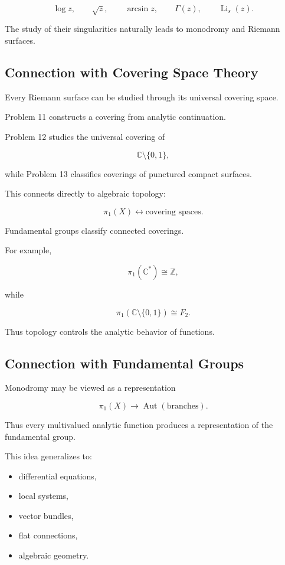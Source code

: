 \documentclass[12pt,a4paper]{article}
\theoremstyle{notespace}
\begin{document}
\[
\log z,
\qquad
\sqrt z,
\qquad
\arcsin z,
\qquad
\Gamma(z),
\qquad
\operatorname{Li}_s(z).
\]

The study of their singularities naturally leads to monodromy and Riemann surfaces.

\subsection{Connection with Covering Space Theory}

Every Riemann surface can be studied through its universal covering space.

Problem 11 constructs a covering from analytic continuation.

Problem 12 studies the universal covering of

\[
\mathbb C\setminus\{0,1\},
\]

while Problem 13 classifies coverings of punctured compact surfaces.

This connects directly to algebraic topology:

\[
\pi_1(X)
\longleftrightarrow
\text{covering spaces}.
\]

Fundamental groups classify connected coverings.

For example,

\[
\pi_1(\mathbb C^*)
\cong
\mathbb Z,
\]

while

\[
\pi_1(\mathbb C\setminus\{0,1\})
\cong
F_2.
\]

Thus topology controls the analytic behavior of functions.

\subsection{Connection with Fundamental Groups}

Monodromy may be viewed as a representation

\[
\pi_1(X)
\longrightarrow
\operatorname{Aut}(\text{branches}).
\]

Thus every multivalued analytic function produces a representation of the fundamental group.

This idea generalizes to:

\begin{itemize}
	\item differential equations,
	\item local systems,
	\item vector bundles,
	\item flat connections,
	\item algebraic geometry.
\end{itemize}
\end{document}
